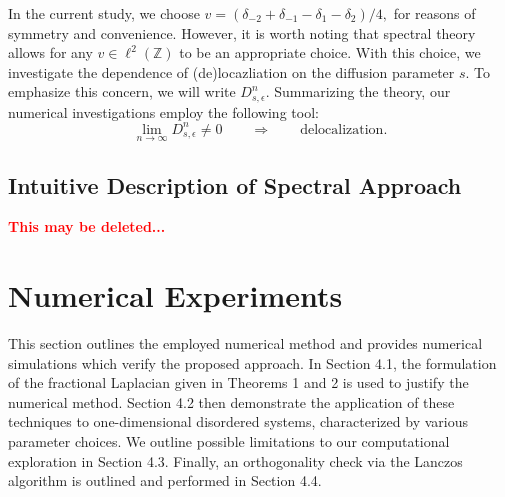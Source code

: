 \documentclass[final,1p,times]{elsarticle}
\def\ZZ{\mathbb Z} %
\newcommand{\no}{\noindent}
\theoremstyle{remark}
\theoremstyle{definition}
\newcommand{\josh}[1]{\textcolor{red}{\textbf{#1}}}
\newcommand{\conni}[1]{\textcolor{blue}{\textbf{#1}}}
\begin{document}
In the current study, we choose $v = (\delta_{-2} + \delta_{-1} - \delta_1 - \delta_2)/4,$ for reasons of symmetry and convenience. However, it is worth noting that spectral theory allows for any $v\in\ell^2(\ZZ)$ to be an appropriate choice. With this choice, we investigate the dependence of (de)locazliation on the diffusion parameter $s$. To emphasize this concern, we will write $ D_{s,\epsilon}^n$. 
Summarizing the theory, our numerical investigations employ the following tool:
\[
\lim_{n\to\infty}D_{s,\epsilon}^n \neq 0
\qquad\Rightarrow\qquad\text{delocalization}.
\]


\subsection{Intuitive Description of Spectral Approach}

\no\josh{This may be deleted...}

\section{Numerical Experiments}

This section outlines the employed numerical method and provides numerical simulations which verify the proposed approach. 
In Section 4.1, the formulation of the fractional Laplacian given in Theorems 1 and 2 is used to justify the numerical method. Section 4.2 then demonstrate the application of these techniques to one-dimensional disordered systems, characterized by various parameter choices. We outline possible limitations to our computational exploration in Section 4.3. Finally, an orthogonality check via the Lanczos algorithm is outlined and performed in Section 4.4.
\end{document}
